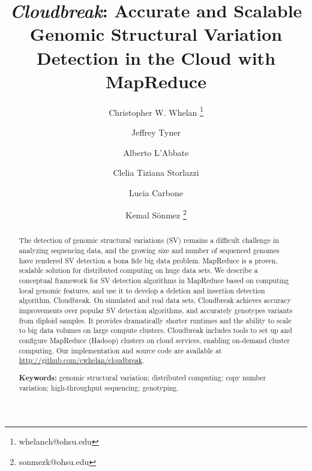 \documentclass[11pt]{article}
\begin{document}
\title{{\em Cloudbreak}: Accurate and Scalable Genomic Structural Variation Detection in the Cloud with MapReduce}

\author[1,5]{Christopher W. Whelan \thanks{whelanch@ohsu.edu}}
\author[3,4]{Jeffrey Tyner}
\author[6]{Alberto L'Abbate}
\author[6]{Clelia Tiziana Storlazzi}
\author[4,5]{Lucia Carbone}
\author[1,2,5]{Kemal S\"onmez \thanks{sonmezk@ohsu.edu}}

\maketitle


 \begin{abstract}

The detection of genomic structural variations (SV) remains a difficult challenge in analyzing sequencing data, and the growing size and number of sequenced genomes have rendered SV detection a bona fide big data problem. MapReduce is a proven, scalable solution for distributed computing on huge data sets. We describe a conceptual framework for SV detection algorithms in MapReduce based on computing local genomic features, and use it to develop a deletion and insertion detection algorithm, Cloudbreak. On simulated and real data sets, Cloudbreak achieves accuracy improvements over popular SV detection algorithms, and accurately genotypes variants from diploid samples. It provides dramatically shorter runtimes and the ability to scale to big data volumes on large compute clusters. Cloudbreak includes tools to set up and configure MapReduce (Hadoop) clusters on cloud services, enabling on-demand cluster computing. Our implementation and source code are available at \url{http://github.com/cwhelan/cloudbreak}. 

 \medskip
 \noindent\textbf{Keywords:} genomic structural variation; distributed computing; copy number variation; high-throughput sequencing; genotyping.
 \end{abstract}

\newpage
\end{document}
